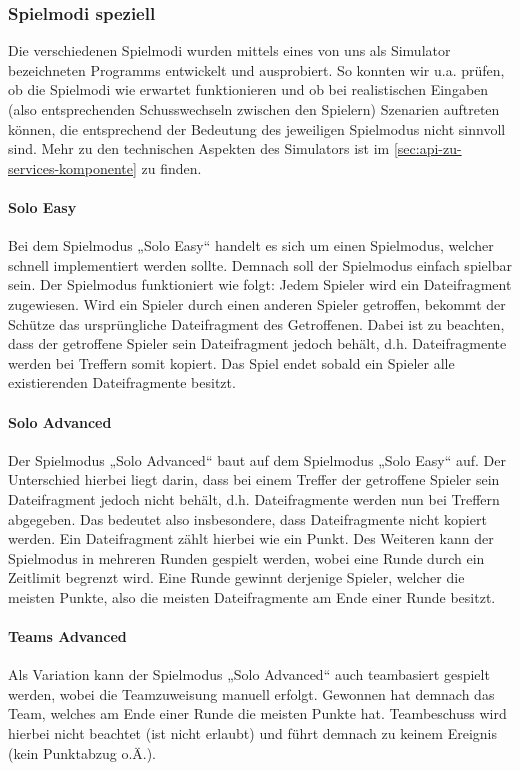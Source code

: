 \subsubsection{Spielmodi speziell}

Die verschiedenen Spielmodi wurden mittels eines von uns als Simulator bezeichneten Programms entwickelt und ausprobiert. So konnten wir u.a. prüfen, ob die Spielmodi wie erwartet funktionieren und ob bei realistischen Eingaben (also entsprechenden Schusswechseln zwischen den Spielern) Szenarien auftreten können, die entsprechend der Bedeutung des jeweiligen Spielmodus nicht sinnvoll sind. Mehr zu den technischen Aspekten des Simulators ist im \cref{sec:api-zu-services-komponente} zu finden.

\paragraph{Solo Easy}
Bei dem Spielmodus „Solo Easy“ handelt es sich um einen Spielmodus, welcher schnell implementiert werden sollte. Demnach soll der Spielmodus einfach spielbar sein. Der Spielmodus funktioniert wie folgt:
Jedem Spieler wird ein Dateifragment zugewiesen. Wird ein Spieler durch einen anderen Spieler getroffen, bekommt der Schütze das ursprüngliche Dateifragment des Getroffenen. Dabei ist zu beachten, dass der getroffene Spieler sein Dateifragment
jedoch behält, d.h. Dateifragmente werden bei Treffern somit kopiert. Das Spiel endet sobald ein Spieler alle existierenden Dateifragmente besitzt.

\paragraph{Solo Advanced}
Der Spielmodus „Solo Advanced“ baut auf dem Spielmodus „Solo Easy“ auf. Der Unterschied hierbei liegt darin, dass bei einem Treffer der getroffene Spieler sein Dateifragment jedoch nicht behält, d.h. Dateifragmente werden nun bei Treffern abgegeben. Das bedeutet also insbesondere, dass Dateifragmente nicht kopiert werden. Ein Dateifragment zählt hierbei wie ein Punkt. Des Weiteren kann der Spielmodus in mehreren Runden gespielt werden, wobei eine Runde durch ein Zeitlimit begrenzt wird. Eine Runde gewinnt derjenige Spieler, welcher die meisten Punkte, also die meisten Dateifragmente am Ende einer Runde besitzt.

\paragraph{Teams Advanced}
Als Variation kann der Spielmodus „Solo Advanced“ auch teambasiert gespielt werden, wobei die Teamzuweisung manuell erfolgt. Gewonnen hat demnach das Team, welches am Ende einer Runde die meisten Punkte hat. Teambeschuss wird hierbei nicht beachtet (ist nicht erlaubt) und führt demnach zu keinem Ereignis (kein Punktabzug o.Ä.).

